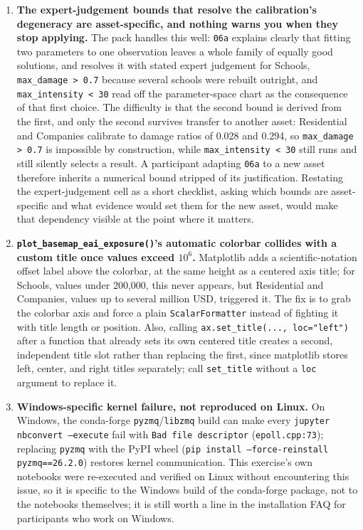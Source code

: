 \documentclass[11pt]{article}
\begin{document}
\begin{enumerate}
\item \textbf{The expert-judgement bounds that resolve the calibration's degeneracy are
asset-specific, and nothing warns you when they stop applying.} The pack handles this
well: \texttt{06a} explains clearly that fitting two parameters to one observation leaves a
whole family of equally good solutions, and resolves it with stated expert judgement for
Schools, \texttt{max\_damage > 0.7} because several schools were rebuilt outright, and
\texttt{max\_intensity < 30} read off the parameter-space chart as the consequence of that
first choice. The difficulty is that the second bound is derived from the first, and only
the second survives transfer to another asset: Residential and Companies calibrate to
damage ratios of 0.028 and 0.294, so \texttt{max\_damage > 0.7} is impossible by
construction, while \texttt{max\_intensity < 30} still runs and still silently selects a
result. A participant adapting \texttt{06a} to a new asset therefore inherits a numerical
bound stripped of its justification. Restating the expert-judgement cell as a short
checklist, asking which bounds are asset-specific and what evidence would set them for the
new asset, would make that dependency visible at the point where it matters.

\item \textbf{\texttt{plot\_basemap\_eai\_exposure()}'s automatic colorbar collides with a
custom title once values exceed $10^6$.} Matplotlib adds a scientific-notation offset label
above the colorbar, at the same height as a centered axis title; for Schools, values under
200,000, this never appears, but Residential and Companies, values up to several million
USD, triggered it. The fix is to grab the colorbar axis and force a plain
\texttt{ScalarFormatter} instead of fighting it with title length or position. Also,
calling \texttt{ax.set\_title(..., loc="left")} after a function that already sets its own
centered title creates a second, independent title slot rather than replacing the first,
since matplotlib stores left, center, and right titles separately; call \texttt{set\_title}
without a \texttt{loc} argument to replace it.

\item \textbf{Windows-specific kernel failure, not reproduced on Linux.} On Windows, the
conda-forge \texttt{pyzmq}/\texttt{libzmq} build can make every
\texttt{jupyter nbconvert --execute} fail with \texttt{Bad file descriptor}
(\texttt{epoll.cpp:73}); replacing \texttt{pyzmq} with the PyPI wheel
(\texttt{pip install --force-reinstall pyzmq==26.2.0}) restores kernel communication. This
exercise's own notebooks were re-executed and verified on Linux without encountering this
issue, so it is specific to the Windows build of the conda-forge package, not to the
notebooks themselves; it is still worth a line in the installation FAQ for participants who
work on Windows.


\end{enumerate}
\end{document}
